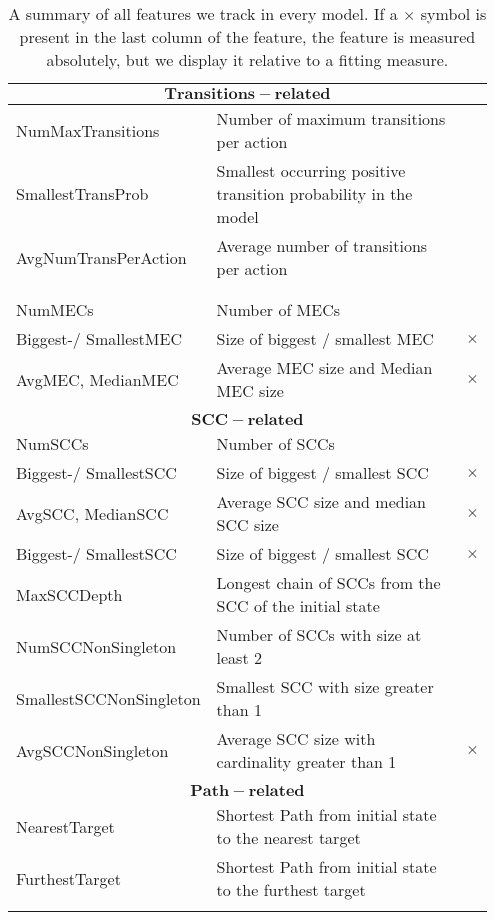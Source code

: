 \begin{longtable}{| p{0.3\linewidth} | p{0.6\linewidth} | p{0.05\linewidth} |}
        \multicolumn{3}{|c|}{$\mathbf{Transitions-related}$} \\\hline
        NumMaxTransitions & Number of maximum transitions per action & \\\hline
        SmallestTransProb & Smallest occurring positive transition probability in the model &  \\\hline
        AvgNumTransPerAction & Average number of transitions per action & \\\hline\multicolumn{3}{c}{}\\[-0.5em]\hline
        \pagebreak
        \multicolumn{3}{|c|}{$\mathbf{MEC-related}$} \\\hline
        NumMECs & Number of MECs & \\\hline
        Biggest-/ SmallestMEC & Size of biggest / smallest MEC & $\times$ \\\hline
        AvgMEC, MedianMEC & Average MEC size and Median MEC size & $\times$ \\\hline\multicolumn{3}{c}{}\\[-0.5em]\hline

        \multicolumn{3}{|c|}{$\mathbf{SCC-related}$} \\\hline
        NumSCCs & Number of SCCs & \\\hline
        Biggest-/ SmallestSCC & Size of biggest / smallest SCC & $\times$ \\\hline
        AvgSCC, MedianSCC & Average SCC size and median SCC size & $\times$ \\\hline
        Biggest-/ SmallestSCC & Size of biggest / smallest SCC & $\times$ \\\hline
        MaxSCCDepth & Longest chain of SCCs from the SCC of the initial state & \\\hline
        NumSCCNonSingleton & Number of SCCs with size at least 2 & \\\hline
        SmallestSCCNonSingleton & Smallest SCC with size greater than 1 & \\\hline
        AvgSCCNonSingleton & Average SCC size with cardinality greater than 1 & $\times$ \\\hline\multicolumn{3}{c}{}\\[-0.5em]\hline

        \multicolumn{3}{|c|}{$\mathbf{Path-related}$} \\\hline
        NearestTarget & Shortest Path from initial state to the nearest target & \\\hline
        FurthestTarget & Shortest Path from initial state to the furthest target &  \\\hline
        \caption{A summary of all features we track in every model. If a $\times$ symbol is present in the last column of the feature,
        the feature is measured absolutely, but we display it relative to a fitting measure.}
        \label{tab:modelFeatures}
    \end{longtable}

